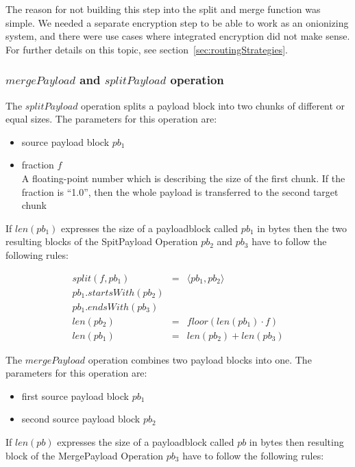 The reason for not building this step into the split and merge function was simple. We needed a separate encryption step to be able to work as an onionizing system, and there were use cases where integrated encryption did not make sense. For further details on this topic, see section~\ref{sec:routingStrategies}.


\subsubsection{$mergePayload$ and $splitPayload$ operation}
The $splitPayload$ operation splits a payload block into two chunks of different or equal sizes. The parameters for this operation are:

\begin{itemize}
	\item source payload block $pb_1$
	\item fraction $f$\\
	A floating-point number which is describing the size of the first chunk. If the fraction is ``1.0'', then the whole payload is transferred to the second target chunk
\end{itemize}

If $len(pb_1)$ expresses the size of a payloadblock called $pb_1$ in bytes then the two resulting blocks of the SpitPayload Operation $pb_2$ and $pb_3$ have to follow the following rules:

\begin{eqnarray}
split(f, pb_1) & = &\langle pb_1, pb_2 \rangle\\
pb_1.startsWith(pb_2)\\
pb_1.endsWith(pb_3)\\
len(pb_2) & = & floor(len(pb_1)\cdot f)\\
len(pb_1) & = & len(pb_2) + len(pb_3)
\end{eqnarray}

The $mergePayload$ operation combines two payload blocks into one. The parameters for this operation are:

\begin{itemize}
	\item first source payload block $pb_1$
	\item second source payload block $pb_2$
\end{itemize}

If $len(pb)$ expresses the size of a payloadblock called $pb$ in bytes then resulting block of the MergePayload Operation $pb_3$ have to follow the following rules:

